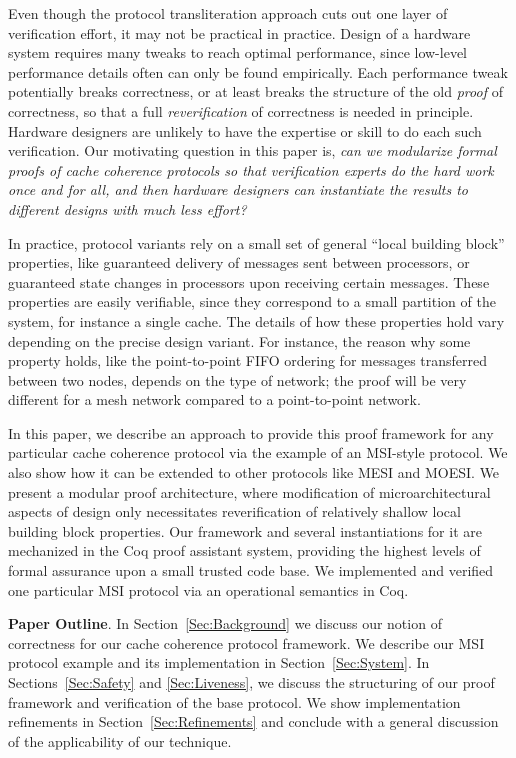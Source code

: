 Even though the protocol transliteration approach cuts out one
layer of verification effort, it may not be practical in practice.
Design of a hardware system requires many tweaks to reach
optimal performance, since low-level performance details often
can only be found empirically.  Each performance tweak potentially
breaks correctness, or at least breaks the structure of the old
\emph{proof} of correctness, so that a full \emph{reverification}
of correctness is needed in principle. Hardware designers are
unlikely to have the expertise or skill to do each such
verification.  Our motivating question in this paper is, \emph{can
we modularize formal proofs of cache coherence protocols so that
verification experts do the hard work once and for all, and then
hardware designers can instantiate the results to different designs
with much less effort?}

In practice, protocol variants rely on a small set of general ``local
building block'' properties, like guaranteed delivery of messages sent
between processors, or guaranteed state changes in processors upon
receiving certain messages.  These properties are
easily verifiable, since they correspond to a small partition of the
system, for instance a single cache.  The details of how these
properties hold vary depending on the precise design variant. For
instance, the reason why some property holds, like the point-to-point
FIFO ordering for messages transferred between two nodes, depends on
the type of network; the proof will be very different for a mesh
network compared to a point-to-point network.

In this paper, we describe an approach to provide this proof framework
for any particular cache coherence protocol via the example of an
MSI-style protocol.  We also show how it can be extended to other protocols
like MESI and MOESI.  We present a modular proof architecture,
where modification of microarchitectural
aspects of design only necessitates reverification of relatively shallow
local building block properties. Our framework and several instantiations
for it are mechanized in the Coq proof assistant system, providing the
highest levels of formal assurance upon a small trusted code base.
We implemented and verified one particular MSI protocol via an
operational semantics in Coq.

\noindent\textbf{Paper Outline}. In Section~\ref{Sec:Background} we
discuss our notion of correctness for our cache coherence protocol
framework. We describe our MSI protocol example and its implementation
in Section~\ref{Sec:System}. In Sections~\ref{Sec:Safety} and
\ref{Sec:Liveness}, we discuss the structuring of our proof framework and
verification of the base protocol. We show implementation refinements
in Section~\ref{Sec:Refinements} and conclude with a general
discussion of the applicability of our technique.
